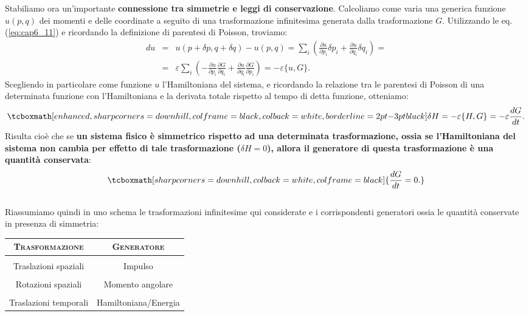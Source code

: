 \documentclass[a4paper,12pt,oneside]{book}
\begin{document}
Stabiliamo ora un'importante \textbf{connessione tra simmetrie e leggi di conservazione}. Calcoliamo come varia una generica funzione $u(p,q)$ dei momenti e delle coordinate a seguito di una trasformazione infinitesima generata dalla trasformazione $G$. Utilizzando le eq. (\ref{eq:cap6_11}) e ricordando la definizione di parentesi di Poisson, troviamo:
	\begin{eqnarray}
		du & = & u(p+\delta p , q+\delta q )- u (p,q) = \sum _i \left( \frac{\partial u}{\partial p_i} \delta p_i + \frac{\partial u}{\partial q_i } \delta q_i \right) = \nonumber \\
		&=& \varepsilon \sum _i \left( -\frac{\partial u}{\partial p_i} \frac{\partial G}{\partial q_i} + \frac{\partial u}{\partial q_i } \frac{\partial G}{\partial p_i} \right) =-\varepsilon \{ u, G \} .
	\end{eqnarray}
Scegliendo in particolare come funzione $u$ l'Hamiltoniana del sistema,  e ricordando la relazione tra le parentesi di Poisson di una determinata funzione con l'Hamiltoniana e la derivata totale rispetto al tempo di detta funzione, otteniamo:
	\begin{equation}
		\tcboxmath[enhanced, sharp corners=downhill, colframe=black, colback=white, borderline={2pt}{-3pt}{black}]{
			\delta H = -\varepsilon \{H,G\} = -\varepsilon \frac{dG}{dt}.
			}
	\end{equation}
Risulta cioè che se \textbf{un sistema fisico è simmetrico rispetto ad una determinata trasformazione, ossia se l'Hamiltoniana del sistema non cambia per effetto di tale trasformazione ($\delta H =0$), allora il generatore di questa trasformazione è una quantità conservata}:
	\begin{equation}
		\tcboxmath[sharp corners=downhill, colback=white, colframe=black]{
			\frac{dG}{dt}=0.
			}
	\end{equation}\\
	
Riassumiamo quindi in uno schema le trasformazioni infinitesime qui considerate e i corrispondenti generatori ossia le quantità conservate in presenza di simmetria:

\begin{table}[!htbp]
\begin{center}
\begin{tabular}{c|c}
\textbf{\textsc{Trasformazione}} & \textbf{\textsc{Generatore}}\\
\hline \\
Traslazioni spaziali & Impulso \\
\hline \\
Rotazioni spaziali & Momento angolare \\
\hline \\
Traslazioni temporali &  Hamiltoniana/Energia \\
\hline 
\end{tabular}
\end{center}
\end{table}
\end{document}
